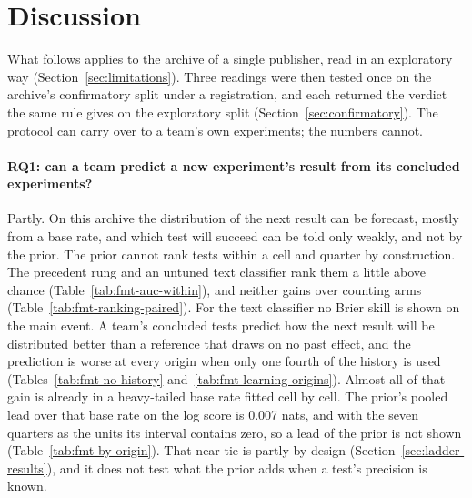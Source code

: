 \section{Discussion}
\label{sec:discussion}
What follows applies to the archive of a single publisher, read in an exploratory way (Section~\ref{sec:limitations}). Three readings were then tested once on the archive's confirmatory split under a registration, and each returned the verdict the same rule gives on the exploratory split (Section~\ref{sec:confirmatory}). The protocol can carry over to a team's own experiments; the numbers cannot.

\paragraph{RQ1: can a team predict a new experiment's result from its concluded experiments?} Partly. On this archive the distribution of the next result can be forecast, mostly from a base rate, and which test will succeed can be told only weakly, and not by the prior. The prior cannot rank tests within a cell and quarter by construction. The precedent rung and an untuned text classifier rank them a little above chance (Table~\ref{tab:fmt-auc-within}), and neither gains over counting arms (Table~\ref{tab:fmt-ranking-paired}). For the text classifier no Brier skill is shown on the main event. A team's concluded tests predict how the next result will be distributed better than a reference that draws on no past effect, and the prediction is worse at every origin when only one fourth of the history is used (Tables~\ref{tab:fmt-no-history} and~\ref{tab:fmt-learning-origins}). Almost all of that gain is already in a heavy-tailed base rate fitted cell by cell. The prior's pooled lead over that base rate on the log score is 0.007 nats, and with the seven quarters as the units its interval contains zero, so a lead of the prior is not shown (Table~\ref{tab:fmt-by-origin}). That near tie is partly by design (Section~\ref{sec:ladder-results}), and it does not test what the prior adds when a test's precision is known.

